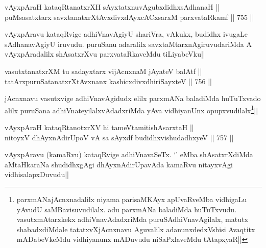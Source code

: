 \begin{shl}
vAyxpAraH kataqRtanatxrXH sAyxtatxnuvAgubxdidhxsAdhanaH || \\
puMsasatxtarx savxtanatxrXtAvxdivxdAyxcACxsarxM parxvataRkamf ||  755 ||  
\end{shl}

\begin{artha} 
vAyxpAravu kataqRvige adhiVnavAgiyU shariVra, vAkukx, budidhx ivugaLe 
sAdhanavAgiyU iruvudu. puruSanu adaralilx savxtaMtarxnAgiruvudariMda A 
vAyxpAradalilx shAsatxrXvu parxvataRkaveMdu tiLiyabeVku||
\end{artha}

\begin{shl}
vasutxtanatxrXM tu sadayxtarx vijAcnxnaM jAyateV balAtf || \\
tatArxpuruSatanatxrXtAvxnanx kashicxdivxdhiriSayxteV ||  756 ||  
\end{shl}

\begin{artha} 
jAcnxnavu vasutxvige adhiVnavAgidudx elilx parxmANa baladiMda 
huTuTxvado alilx puruSana adhiVnateyilalxvAdadxriMda yAva vidhiyanUnx 
opupxvudilalx\footnote[1]{parxmANajAcnxnadalilx niyama parisaMKAyx 
apUvaRveMba vidhigaLu yAvudU saMBavisuvudilalx. adu parxmANa baladiMda 
huTuTxvudu. vasutxmAtarxkekx adhiVnavAdadxriMda puruSAdhiVnavAgilalx, 
matutx shabadxdiMdale tatatxvXjAcnxnavu Aguvalilx adanunxdedxVshisi 
Avaqtitx mADabeVkeMdu vidhiyanunx mADuvudu niSaPxlaveMdu tAtapxyaR||}||
\end{artha}


\begin{shl}
vAyxpAraH kataqRtanotxrXV hi tameVtamitishAsarxtaH || \\
nitoyxV dhAyxnAdirUpoV vA sa sAyxdf budidhxvishudadhxyeV ||  757 ||  
\end{shl}

\begin{artha} 
vAyxpAravu (kamaRvu) kataqRvige adhiVnavaSeTx. `\stext' eMba 
shAsatxrXdiMda aMtaHkaraNa shudidhxgAgi dhAyxnAdirUpavAda kamaRvu 
nitayxvAgi vidhisalapxDuvudu||
\end{artha}

